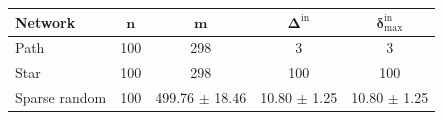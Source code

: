 \begingroup
\small
\setlength{\tabcolsep}{4pt}
\begin{tabular}{lcccc}
\toprule
\textbf{Network} & $\mathbf{n}$ & $\mathbf{m}$ & $\boldsymbol{\Delta}^{\mathrm{in}}$ & $\boldsymbol{\delta}_{\max}^{\mathrm{in}}$ \\
\midrule
Path & 100 & 298 & 3 & 3 \\
Star & 100 & 298 & 100 & 100 \\
Sparse random & 100 & 499.76 $\pm$ 18.46 & 10.80 $\pm$ 1.25 & 10.80 $\pm$ 1.25 \\
\bottomrule
\end{tabular}
\endgroup
